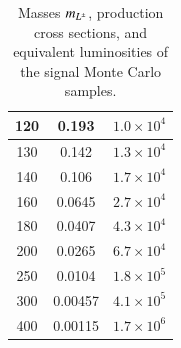 \begin{table}[htbp]
\begin{tabular}{|c||c|c|}
		\hline
		120	& 0.193 	 	&	$1.0\times10^4$ \\%
		\hline
		130	& 0.142 	 	&	$1.3\times10^4$ \\%
		\hline
		140	& 0.106 	 	&	$1.7\times10^4$ \\%
		\hline
		160	& 0.0645  	&	$2.7\times10^4$ \\%
		\hline
		180	& 0.0407  	&	$4.3\times10^4$ \\%
		\hline
		200	& 0.0265  	&	$6.7\times10^4$ \\%
		\hline
		250	& 0.0104  	&	$1.8\times10^5$ \\%
		\hline
		300	& 0.00457 	&	$4.1\times10^5$ \\%
		\hline
		400	& 0.00115 	&	$1.7\times10^6$ \\%
		\hline
	\end{tabular}
	\caption{Masses $m_{L^{\pm}}$, production cross sections, and equivalent luminosities of the signal Monte Carlo samples.}
	\label{table:resonance-signal-samples}
\end{table}


